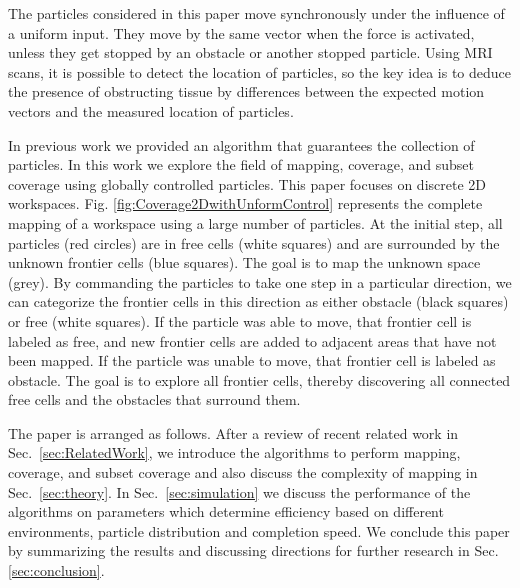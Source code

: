 The particles considered in this paper move synchronously under the influence of a uniform input.
They move by the same vector when the force is activated,
unless they get stopped by an obstacle or another stopped particle.  
Using MRI scans, it is possible to detect the location of particles, so the key idea is to deduce the presence of obstructing tissue by differences between the expected motion vectors and 
the measured location of particles.

In previous work \cite{mahadev2016collecting} we provided an algorithm that guarantees the collection of particles.
 In this work we explore the field of mapping, coverage, and subset coverage using globally controlled particles. 
 This paper focuses on discrete 2D workspaces.
Fig. \ref{fig:Coverage2DwithUnformControl} represents the complete mapping of a workspace using a large number of particles.  
At the initial step, all  particles (red circles) are in free cells (white squares) and are surrounded by the unknown frontier cells (blue squares). The goal is to map the unknown space (grey).
By commanding the particles to take one step in a particular direction, we can categorize the frontier cells in this direction as either obstacle (black squares) or free (white squares).
 If the particle was able to move, that frontier cell is labeled as free, and new frontier cells are added to adjacent areas that have not been mapped.
 If the particle was unable to move, that frontier cell is labeled as obstacle.
The goal is to explore all  frontier cells, thereby discovering all connected free cells and the obstacles that surround them. 

The paper is arranged as follows. 
After a review of recent related work in Sec.~\ref{sec:RelatedWork}, we introduce the algorithms to perform mapping, coverage, and subset coverage and also discuss the complexity of mapping in Sec.~\ref{sec:theory}.
 In Sec.~\ref{sec:simulation} we discuss the performance of the algorithms on parameters which determine efficiency based on different environments, particle distribution and completion speed. We conclude this paper by summarizing the results and discussing
 directions for further research in Sec.  \ref{sec:conclusion}.